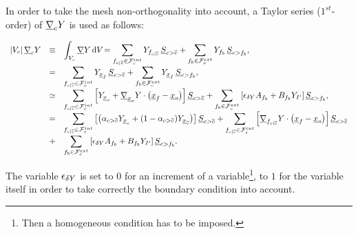 In order to take the mesh non-orthogonality into account, a Taylor series ($1^{st}$-order) of $\underline{\nabla}_{c} Y$ is used as follows:

\begin{equation}\label{eq:compute_gradrc1}
\begin{array}{r c l}
\left| V_{c} \right| \underline{\nabla}_{c} Y &
\equiv & \displaystyle
\int_{V_{c}}{\underline{\nabla} Y \, \mathrm{d} V_{} }
= \sum\limits_{ {{f}_{c|{\overline{c}}}} \in \mathcal{F}^{int}_{c}}
Y_{{{f}_{c|{\overline{c}}}}}\,{\underline{S}_{{c > {\overline{c}}}}}
+\sum\limits_{ {{f}_{b}} \in \mathcal{F}^{ext}_{c}}
Y_{{{f}_{b}}}\,{\underline{S}_{{c>{{f}_{b}}} }}, \\
&=& \displaystyle
 \sum\limits_{ {{f}_{c|{\overline{c}}}} \in \mathcal{F}^{int}_{c}}
Y_{\underline{x}_{{f}}}\,{\underline{S}_{{c > {\overline{c}}}}}
+\sum\limits_{ {{f}_{b}} \in \mathcal{F}^{ext}_{c}}
Y_{\underline{x}_{{f}}}\,{\underline{S}_{{c>{{f}_{b}}} }}, \\
&\simeq &  \displaystyle
\sum\limits_{ {{f}_{c|{\overline{c}}}} \in \mathcal{F}^{int}_{c}} \left[ Y_{\underline{x}_o}+ \underline{\nabla}_{\underline{x}_o} Y \cdot \left(\underline{x}_{{f}} - \underline{x}_o\right) \right] \underline{S}_{{c > {\overline{c}}}}+
\sum\limits_{ {{f}_{b}} \in \mathcal{F}^{ext}_{c}} \left[ \epsilon_{\delta Y} A_{{{f}_{b}}} + B_{{{f}_{b}}} Y_{{I^\prime}} \right] \underline{S}_{{c>{{f}_{b}}}} ,\\
 & = &\displaystyle
\sum\limits_{ {{f}_{c|{\overline{c}}}} \in \mathcal{F}^{int}_{c}}
\left[
\left( \alpha_{{c > {\overline{c}}}} Y_{{\underline{x}_{c}}} +
(1 - \alpha_{{c > {\overline{c}}}}) Y_{\underline{x}_{{\overline{c}}}} \right) \right] \underline{S}_{{c > {\overline{c}}}} +
\sum\limits_{ {{f}_{c|{\overline{c}}}} \in \mathcal{F}^{int}_{i}} \left[
\underline{\nabla}_{{{f}_{c|{\overline{c}}}}} Y  \cdot  \left(\underline{x}_{{f}} - \underline{x}_o\right) \right] \underline{S}_{{c > {\overline{c}}}} \\
&+&\displaystyle
\sum\limits_{ {{f}_{b}} \in \mathcal{F}^{ext}_{c}} \left[ \epsilon_{\delta Y} A_{{{f}_{b}}} + B_{{{f}_{b}}} Y_{{I^\prime}} \right] \underline{S}_{{c>{{f}_{b}}}} .
\end{array}
\end{equation}

The variable $\epsilon_{\delta Y}$ is set to $0$ for an increment of a variable\footnote{
Then a homogeneous condition has to be imposed.
},
 to $1$ for the variable itself in order to take
correctly the boundary condition into account.

